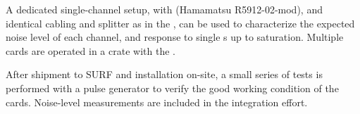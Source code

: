A dedicated single-channel setup, with  (Hamamatsu R5912-02-mod), and identical cabling and splitter as in the , can be used to characterize the expected noise level of each channel, and response to single \phel{}s up to saturation. 
Multiple cards are operated in a  crate with the .

After shipment to SURF and installation on-site, a small series of tests is performed with a pulse generator to verify the good working condition of the cards. Noise-level measurements are included in the integration effort.
